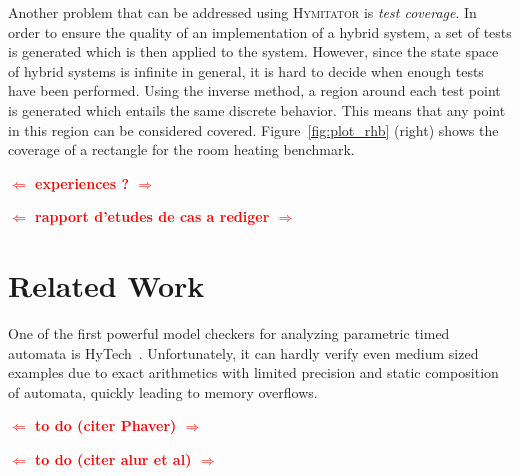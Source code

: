 \documentclass{llncs}
\newcommand{\hytech}{{\sc HyTech}}
\newcommand{\hymitator}{\textsc{Hymitator}}
\newcommand{\commentaire}[1]{\textcolor{red}{\textbf{$\Leftarrow$  #1 $\Rightarrow$}}}
\begin{document}
Another problem that can be addressed using \hymitator{} is \emph{test   coverage}. In order to ensure the quality of an implementation of a hybrid system, a set of tests is generated which is then applied to the system. However, since the state space of hybrid systems is infinite in general, it is hard to decide when enough tests have been performed. Using the inverse method, a region around each test point is generated which entails the same discrete behavior. This means that any point in this region can be considered covered. Figure~\ref{fig:plot_rhb} (right) shows the coverage of a rectangle for the room heating benchmark.


\commentaire{experiences ?}

\commentaire{rapport d'etudes de cas a rediger}



\section{Related Work}


One of the first powerful model checkers for analyzing parametric timed automata is \hytech{}~\cite{hhw97}.
Unfortunately, it can hardly verify even medium sized examples due to exact arithmetics with limited precision and static composition of automata, quickly leading to memory overflows.

\commentaire{to do (citer Phaver)}

\commentaire{to do (citer alur et al)}







\end{document}
